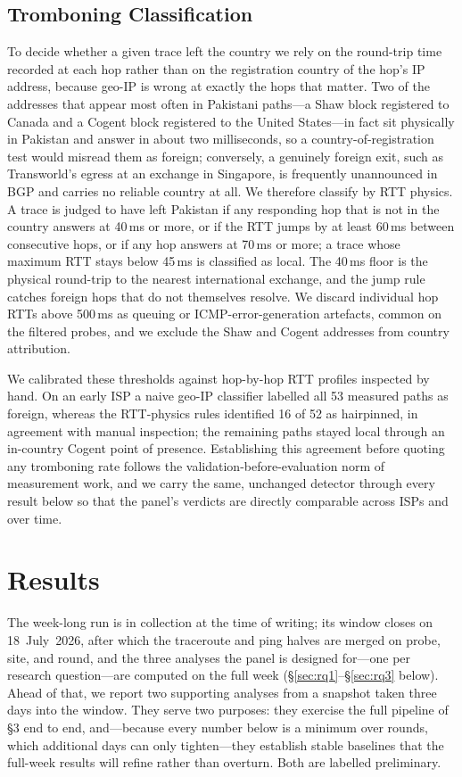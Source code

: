 \documentclass[sigconf,anonymous,10pt]{acmart}
\begin{document}
\subsection{Tromboning Classification}
\label{sec:detector}
To decide whether a given trace left the country we rely on the round-trip time recorded at each hop
rather than on the registration country of the hop's IP address, because geo-IP is wrong at exactly
the hops that matter. Two of the addresses that appear most often in Pakistani paths---a Shaw block
registered to Canada and a Cogent block registered to the United States---in fact sit physically in
Pakistan and answer in about two milliseconds, so a country-of-registration test would misread them
as foreign; conversely, a genuinely foreign exit, such as Transworld's egress at an exchange in
Singapore, is frequently unannounced in BGP and carries no reliable country at all. We therefore
classify by RTT physics. A trace is judged to have left Pakistan if any responding hop that is not
in the country answers at 40\,ms or more, or if the RTT jumps by at least 60\,ms between consecutive
hops, or if any hop answers at 70\,ms or more; a trace whose maximum RTT stays below 45\,ms is
classified as local. The 40\,ms floor is the physical round-trip to the nearest international
exchange, and the jump rule catches foreign hops that do not themselves resolve. We discard
individual hop RTTs above 500\,ms as queuing or ICMP-error-generation artefacts, common on the
filtered probes, and we exclude the Shaw and Cogent addresses from country attribution.

We calibrated these thresholds against hop-by-hop RTT profiles inspected by hand. On an early ISP a
naive geo-IP classifier labelled all 53 measured paths as foreign, whereas the RTT-physics rules
identified 16 of 52 as hairpinned, in agreement with manual inspection; the remaining paths stayed
local through an in-country Cogent point of presence. Establishing this agreement before quoting any
tromboning rate follows the validation-before-evaluation norm of measurement work, and we carry the
same, unchanged detector through every result below so that the panel's verdicts are directly
comparable across ISPs and over time.

\section{Results}
\label{sec:results}
The week-long run is in collection at the time of writing; its window closes on 18~July~2026,
after which the traceroute and ping halves are merged on probe, site, and round, and the three
analyses the panel is designed for---one per research question---are computed on the full week
(\S\ref{sec:rq1}--\S\ref{sec:rq3} below). Ahead of that, we report two supporting analyses from a
snapshot taken three days into the window. They serve two purposes: they exercise the full
pipeline of \S3 end to end, and---because every number below is a minimum over rounds, which
additional days can only tighten---they establish stable baselines that the full-week results will
refine rather than overturn. Both are labelled preliminary.
\end{document}

